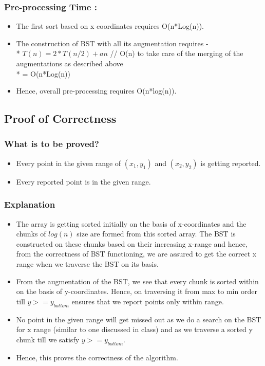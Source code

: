 \documentclass{article}
\begin{document}
\subsubsection{Pre-processing Time : }
\begin{itemize}
\item The first sort based on x coordinates requires O(n*Log(n)).
\item The construction of BST with all its augmentation requires - \\*
$T(n) = 2*T(n/2) + an$ // O(n) to take care of the merging of the augmentations as described above \\*
= O(n*Log(n))
\item Hence, overall pre-processing requires O(n*log(n)).  

\end{itemize}
\subsection{Proof of Correctness}
\subsubsection{What is to be proved?}
\begin{itemize}
\item Every point in the given range of $(x_1,y_1)$ and $(x_2,y_2)$ is getting reported.
\item Every reported point is in the given range.
\end{itemize}
\subsubsection{Explanation}
\begin{itemize}
\item The array is getting sorted initially on the basis of x-coordinates and the chunks of $log(n)$ size are formed from this sorted array. The BST is constructed on these chunks based on their increasing x-range and hence, from the correctness of BST functioning, we are assured to get the correct x range when we traverse the BST on its basis.
\item From the augmentation of the BST, we see that every chunk is sorted within on the basis of y-coordinates. Hence, on traversing it from max to min order till $y>=y_{bottom}$ ensures that we report points only within range.
\item No point in the given range will get missed out as we do a search on the BST for x range (similar to one discussed in class) and as we traverse a sorted y chunk till we satisfy $y>=y_{bottom}$. 
\item Hence, this proves the correctness of the algorithm. 
\end{itemize}
\newpage
\end{document}
